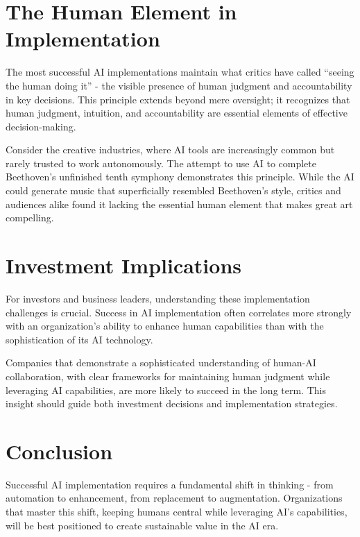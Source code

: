 \documentclass[
  Letterpaper,
]{scrbook}
\begin{document}
\section{The Human Element in
Implementation}\label{the-human-element-in-implementation}

The most successful AI implementations maintain what critics have called
``seeing the human doing it'' - the visible presence of human judgment
and accountability in key decisions. This principle extends beyond mere
oversight; it recognizes that human judgment, intuition, and
accountability are essential elements of effective decision-making.

Consider the creative industries, where AI tools are increasingly common
but rarely trusted to work autonomously. The attempt to use AI to
complete Beethoven's unfinished tenth symphony demonstrates this
principle. While the AI could generate music that superficially
resembled Beethoven's style, critics and audiences alike found it
lacking the essential human element that makes great art compelling.

\section{Investment Implications}\label{investment-implications-2}

For investors and business leaders, understanding these implementation
challenges is crucial. Success in AI implementation often correlates
more strongly with an organization's ability to enhance human
capabilities than with the sophistication of its AI technology.

Companies that demonstrate a sophisticated understanding of human-AI
collaboration, with clear frameworks for maintaining human judgment
while leveraging AI capabilities, are more likely to succeed in the long
term. This insight should guide both investment decisions and
implementation strategies.

\section{Conclusion}\label{conclusion-1}

Successful AI implementation requires a fundamental shift in thinking -
from automation to enhancement, from replacement to augmentation.
Organizations that master this shift, keeping humans central while
leveraging AI's capabilities, will be best positioned to create
sustainable value in the AI era.
\end{document}
